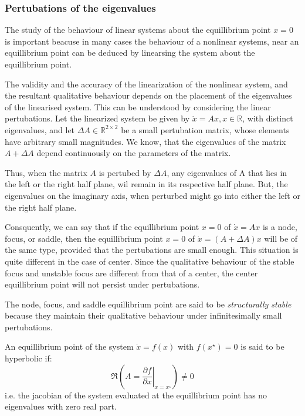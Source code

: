 \subsubsection{Pertubations of the eigenvalues}
The study of the behaviour of linear systems about the equillibrium point \(x=0\) is important
beacuse in many cases the behaviour of a nonlinear systems, near an equillibrium point can
be deduced by linearsing the system about the equillibrium point.

The validity and the accuracy of the linearization of the nonlinear system, and the resultant
qualitative behaviour depends on the placement of the eigenvalues of the linearised system.
This can be understood by considering the linear pertubations. Let the linearized system be
given by \(\dot{x} = Ax, x\in\mathbb{R} \), with distinct eigenvalues, and let
\(\Delta A \in \mathbb{R}^{2\times 2}\) be a small pertubation matrix, whose elements have arbitrary
small magnitudes. We know, that the eigenvalues of the matrix \(A + \Delta A\)
depend continuously on the parameters of the matrix. 

Thus, when the matrix \(A\) is pertubed by \(\Delta A\), any eigenvalues of A that lies in
the left or the right half plane, wil remain in its respective half plane. But, the eigenvalues
on the imaginary axis, when perturbed might go into either the left or the right half plane.

Consquently, we can say that if the equillibrium point \(x=0\) of \(\dot{x} = Ax \) is a
node, focus, or saddle, then the equillibrium point \(x=0\) of \(\dot{x} = (A + \Delta A) x \)
will be of the same type, provided that the pertubations are small enough. This situation is quite different in the case of center. Since the qualitative behaviour of the
stable focus and unstable focus are different from that of a center, the center equillibrium 
point will not persist under pertubations.

The node, focus, and saddle equillibrium point are said to be \emph{structurally stable} because they
maintain their qualitative behaviour under infinitesimally small pertubations.

\begin{definition}
    An equillibrium point of the system \(\dot{x}= f(x)\) with \(f(x^{\star}) = 0\) is said to be
    hyperbolic if:
    \[
        \Re \left(
            A = \left . \frac{\partial f}{\partial x} \right |_{x=x^{\star}}
        \right) \neq 0
    \] 
    i.e. the jacobian of the system evaluated at the equillibrium point has no eigenvalues
    with zero real part.
\end{definition}

